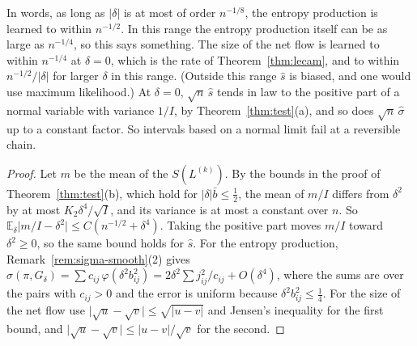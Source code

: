 \documentclass[11pt]{article}
\theoremstyle{definition}
\theoremstyle{remark}
\newcommand{\E}{\mathbb E}
\begin{document}
In words, as long as $\lvert\delta\rvert$ is at most of order $n^{-1/8}$, the
entropy production is learned to within $n^{-1/2}$. In this range the entropy
production itself can be as large as $n^{-1/4}$, so this says something. The
size of the net flow is learned to within $n^{-1/4}$ at $\delta=0$, which is
the rate of Theorem~\ref{thm:lecam}, and to within $n^{-1/2}/\lvert\delta\rvert$
for larger $\delta$ in this range. (Outside this range $\hat s$ is biased, and
one would use maximum likelihood.) At $\delta=0$, $\sqrt n\,\hat s$ tends in law
to the positive part of a normal variable with variance $1/I$, by
Theorem~\ref{thm:test}(a), and so does $\sqrt n\,\hat\sigma$ up to a constant
factor. So intervals based on a normal limit fail at a reversible chain.

\begin{proof}
Let $m$ be the mean of the $S(L^{(k)})$. By the bounds in the proof of
Theorem~\ref{thm:test}(b), which hold for
$\lvert\delta\rvert\bar b\le\frac12$, the mean of $m/I$ differs from
$\delta^2$ by at most $K_2\delta^4/\sqrt I$, and its variance is at most a
constant over $n$. So $\E_\delta\lvert m/I-\delta^2\rvert\le C(n^{-1/2}+\delta^4)$.
Taking the positive part moves $m/I$ toward $\delta^2\ge0$, so the same bound
holds for $\hat s$. For the entropy production,
Remark~\ref{rem:sigma-smooth}(2) gives
$\sigma(\pi,G_\delta)=\sum c_{ij}\,\varphi(\delta^2b_{ij}^2)
=2\delta^2\sum j_{ij}^2/c_{ij}+O(\delta^4)$, where the sums are over the pairs
with $c_{ij}>0$ and the error is uniform because
$\delta^2b_{ij}^2\le\frac14$. For the size of the net flow use
$\lvert\sqrt u-\sqrt v\rvert\le\sqrt{\lvert u-v\rvert}$ and Jensen's
inequality for the first bound, and
$\lvert\sqrt u-\sqrt v\rvert\le\lvert u-v\rvert/\sqrt v$ for the second.
\end{proof}
\end{document}
